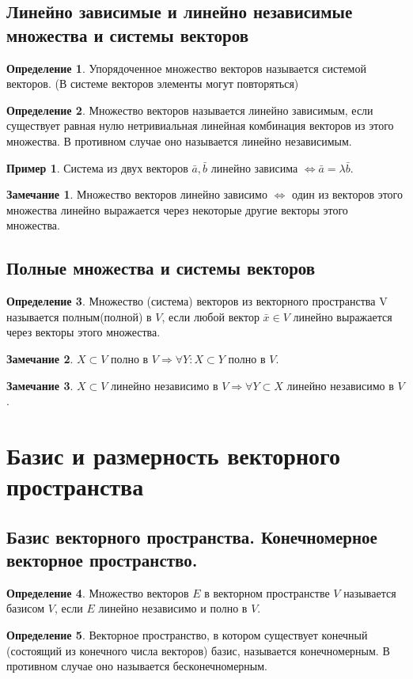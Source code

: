 \documentclass[a4paper, 12pt]{article}
\theoremstyle{definition}
\newtheorem*{definition}{Определение}
\newtheorem*{remark}{Замечание}
\newtheorem*{example}{Пример}
\begin{document}
	\subsection{Линейно зависимые и линейно независимые множества и системы векторов}
	\begin{definition}
		Упорядоченное множество векторов называется системой векторов.
		(В системе векторов элементы могут повторяться)
	\end{definition}
	\begin{definition}
		Множество векторов называется линейно зависимым, если существует равная нулю нетривиальная линейная комбинация векторов из этого множества. В противном случае оно называется линейно независимым.
	\end{definition}
	\begin{example}
		Система из двух векторов $\bar{a}, \bar{b}$ линейно зависима $\Leftrightarrow \bar{a} = \lambda\bar{b}$.
	\end{example}
	\begin{remark}
		Множество векторов линейно зависимо $\Leftrightarrow$ один из векторов этого множества линейно выражается через некоторые другие векторы этого множества.
	\end{remark}
	\subsection{Полные множества и системы векторов}
	\begin{definition}
		Множество (система) векторов из векторного пространства V называется полным(полной) в $V$, если любой вектор $\bar{x}\in V$ линейно выражается через векторы этого множества.
	\end{definition}
	\begin{remark}
		$X \subset V$ полно в $V \Rightarrow \forall Y: X\subset Y$ полно в $V$.
	\end{remark}
	\begin{remark}
		$X \subset V$ линейно независимо в $V \Rightarrow \forall Y \subset X$ линейно независимо в $V$.
	\end{remark}
	\section{Базис и размерность векторного пространства}
	\subsection{Базис векторного пространства. Конечномерное векторное пространство.}
	\begin{definition}
		Множество векторов $E$ в векторном пространстве $V$ называется базисом $V$, если $E$ линейно независимо и полно в $V$.
	\end{definition}
	\begin{definition}
		Векторное пространство, в котором существует конечный (состоящий из конечного числа векторов) базис, называется конечномерным. В противном случае оно называется бесконечномерным. 
	\end{definition}
\end{document}
